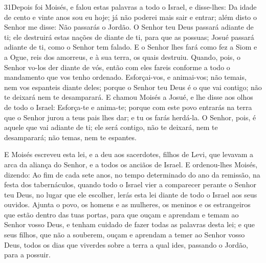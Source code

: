 \medskip

\lettrine{31} Depois foi Moisés, e falou estas palavras a todo
o Israel, e disse-lhes: Da idade de cento e vinte anos sou eu
hoje; já não poderei mais sair e entrar; além disto o Senhor me
disse: Não passarás o Jordão. O Senhor teu Deus passará adiante
de ti; ele destruirá estas nações de diante de ti, para que as
possuas; Josué passará adiante de ti, como o Senhor tem falado.
E o Senhor lhes fará como fez a Siom e a Ogue, reis dos
amorreus, e à sua terra, os quais destruiu. Quando, pois, o
Senhor vo-los der diante de vós, então com eles fareis conforme a
todo o mandamento que vos tenho ordenado. Esforçai-vos, e
animai-vos; não temais, nem vos espanteis diante deles; porque o
Senhor teu Deus é o que vai contigo; não te deixará nem te
desamparará. E chamou Moisés a Josué, e lhe disse aos olhos de
todo o Israel: Esforça-te e anima-te; porque com este povo entrarás
na terra que o Senhor jurou a teus pais lhes dar; e tu os farás
herdá-la. O Senhor, pois, é aquele que vai adiante de ti; ele
será contigo, não te deixará, nem te desamparará; não temas, nem te
espantes.

E Moisés escreveu esta lei, e a deu aos sacerdotes, filhos de
Levi, que levavam a arca da aliança do Senhor, e a todos os anciãos
de Israel. E ordenou-lhes Moisés, dizendo: Ao fim de cada
sete anos, no tempo determinado do ano da remissão, na festa dos
tabernáculos, quando todo o Israel vier a comparecer perante
o Senhor teu Deus, no lugar que ele escolher, lerás esta lei diante
de todo o Israel aos seus ouvidos. Ajunta o povo, os homens e
as mulheres, os meninos e os estrangeiros que estão dentro das tuas
portas, para que ouçam e aprendam e temam ao Senhor vosso Deus, e
tenham cuidado de fazer todas as palavras desta lei; e que
seus filhos, que não a souberem, ouçam e aprendam a temer ao Senhor
vosso Deus, todos os dias que viverdes sobre a terra a qual ides,
passando o Jordão, para a possuir.

